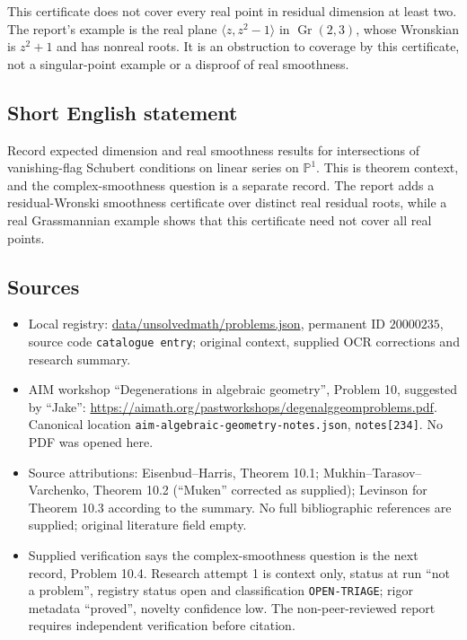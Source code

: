 \documentclass[11pt]{article}
\newcommand{\PP}{\mathbb{P}}
\begin{document}
This certificate does not cover every real point in residual dimension at least two. The report's example is the real plane $\langle z,z^2-1\rangle$ in $\operatorname{Gr}(2,3)$, whose Wronskian is $z^2+1$ and has nonreal roots. It is an obstruction to coverage by this certificate, not a singular-point example or a disproof of real smoothness.
\subsection{Short English statement}
Record expected dimension and real smoothness results for intersections of vanishing-flag Schubert conditions on linear series on $\PP^1$. This is theorem context, and the complex-smoothness question is a separate record. The report adds a residual-Wronski smoothness certificate over distinct real residual roots, while a real Grassmannian example shows that this certificate need not cover all real points.
\subsection{Sources}
\begin{itemize}
\item Local registry: \url{data/unsolvedmath/problems.json}, permanent ID $20000235$, source code \texttt{catalogue entry}; original context, supplied OCR corrections and research summary.
\item AIM workshop ``Degenerations in algebraic geometry'', Problem 10, suggested by ``Jake'': \url{https://aimath.org/pastworkshops/degenalggeomproblems.pdf}. Canonical location \texttt{aim-algebraic-geometry-notes.json}, \texttt{notes[234]}. No PDF was opened here.
\item Source attributions: Eisenbud--Harris, Theorem 10.1; Mukhin--Tarasov--Varchenko, Theorem 10.2 (``Muken'' corrected as supplied); Levinson for Theorem 10.3 according to the summary. No full bibliographic references are supplied; original literature field empty.
\item Supplied verification says the complex-smoothness question is the next record, Problem 10.4. Research attempt 1 is context only, status at run ``not a problem'', registry status open and classification \texttt{OPEN-TRIAGE}; rigor metadata ``proved'', novelty confidence low. The non-peer-reviewed report requires independent verification before citation.
\end{itemize}
\end{document}
